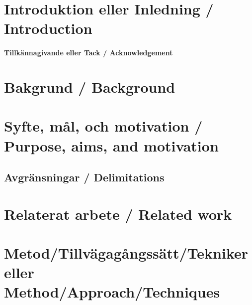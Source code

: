 \documentclass[a4paper,12pt]{article}
\begin{document}
\tableofcontents


\cleardoublepage


\newpage

\mainmatter


\section{Introduktion eller Inledning / Introduction}
\label{sec:introduktion}


\paragraph{Tillkännagivande eller Tack / Acknowledgement}



\section{Bakgrund / Background}
\label{sec:bakgrund}


\section{Syfte, mål, och motivation / Purpose, aims, and motivation}\label{sec:syfte}


\subsection{Avgränsningar / Delimitations}


\section{Relaterat arbete / Related work}


\section{Metod/Tillvägagångssätt/Tekniker eller Method/Approach/Techniques}
\label{sec:metod}

\end{document}
